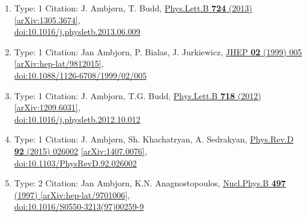 \documentclass[a4paper,10pt]{article}
\begin{document}
\begin{enumerate}
\begin{enumerate}
  \item Type: 1 Citation: J. Ambjørn, T. Budd, \href{https://www.doi.org/10.1016/j.physletb.2013.06.009}{Phys.Lett.B {\bf 724} (2013) }  \href{https://arxiv.org/abs/1305.3674}{[arXiv:1305.3674]},\\\href{https://www.doi.org/10.1016/j.physletb.2013.06.009}{doi:10.1016/j.physletb.2013.06.009}
  \item Type: 1 Citation: Jan Ambjorn, P. Bialas, J. Jurkiewicz, \href{https://www.doi.org/10.1088/1126-6708/1999/02/005}{JHEP {\bf 02} (1999) 005}  \href{https://arxiv.org/abs/hep-lat/9812015}{[arXiv:hep-lat/9812015]},\\\href{https://www.doi.org/10.1088/1126-6708/1999/02/005}{doi:10.1088/1126-6708/1999/02/005}
  \item Type: 1 Citation: J. Ambjorn, T.G. Budd, \href{https://www.doi.org/10.1016/j.physletb.2012.10.012}{Phys.Lett.B {\bf 718} (2012) }  \href{https://arxiv.org/abs/1209.6031}{[arXiv:1209.6031]},\\\href{https://www.doi.org/10.1016/j.physletb.2012.10.012}{doi:10.1016/j.physletb.2012.10.012}
  \item Type: 1 Citation: J. Ambjørn, Sh. Khachatryan, A. Sedrakyan, \href{https://www.doi.org/10.1103/PhysRevD.92.026002}{Phys.Rev.D {\bf 92} (2015) 026002}  \href{https://arxiv.org/abs/1407.0076}{[arXiv:1407.0076]},\\\href{https://www.doi.org/10.1103/PhysRevD.92.026002}{doi:10.1103/PhysRevD.92.026002}
  \item Type: 2 Citation: Jan Ambjorn, K.N. Anagnostopoulos, \href{https://www.doi.org/10.1016/S0550-3213(97)00259-9}{Nucl.Phys.B {\bf 497} (1997) }  \href{https://arxiv.org/abs/hep-lat/9701006}{[arXiv:hep-lat/9701006]},\\\href{https://www.doi.org/10.1016/S0550-3213(97)00259-9}{doi:10.1016/S0550-3213(97)00259-9}

\end{enumerate}
\end{enumerate}
\end{document}
